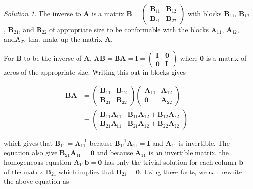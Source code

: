 \documentclass[
]{book}
\theoremstyle{definition}
\theoremstyle{definition}
\theoremstyle{definition}
\theoremstyle{remark}
\newtheorem*{solution}{Solution}
\begin{document}
\begin{solution}

The inverse to \(\mathbf{A}\) is a matrix \(\mathbf{B} = \begin{pmatrix} \mathbf{B}_{11} & \mathbf{B}_{12} \\ \mathbf{B}_{21} & \mathbf{B}_{22} \end{pmatrix}\) with blocks \(\mathbf{B}_{11}\), \(\mathbf{B}_{12}\), \(\mathbf{B}_{21}\), and \(\mathbf{B}_{22}\) of appropriate size to be conformable with the blocks \(\mathbf{A}_{11}\), \(\mathbf{A}_{12}\), and\(\mathbf{A}_{22}\) that make up the matrix \(\mathbf{A}\).

For \(\mathbf{B}\) to be the inverse of \(\mathbf{A}\), \(\mathbf{A}\mathbf{B} = \mathbf{B}\mathbf{A} = \mathbf{I} = \begin{pmatrix} \mathbf{I} & \mathbf{0} \\ \mathbf{0} & \mathbf{I} \end{pmatrix}\) where \(\mathbf{0}\) is a matrix of zeros of the appropriate size. Writing this out in blocks gives

\[
\begin{aligned}
\mathbf{B}\mathbf{A} & = \begin{pmatrix} \mathbf{B}_{11} & \mathbf{B}_{12} \\ \mathbf{B}_{21} & \mathbf{B}_{22} \end{pmatrix}  \begin{pmatrix} \mathbf{A}_{11} & \mathbf{A}_{12} \\ \mathbf{0} & \mathbf{A}_{22} \end{pmatrix} \\
& = \begin{pmatrix} \mathbf{B}_{11} \mathbf{A}_{11} & \mathbf{B}_{11} \mathbf{A}_{12} + \mathbf{B}_{12} \mathbf{A}_{22} \\ \mathbf{B}_{21} \mathbf{A}_{11} & \mathbf{B}_{21} \mathbf{A}_{12} + \mathbf{B}_{22} \mathbf{A}_{22}\end{pmatrix}
\end{aligned}
\]

which gives that \(\mathbf{B}_{11} = \mathbf{A}_{11}^{-1}\) because \(\mathbf{B}_{11}^{-1}\mathbf{A}_{11} = \mathbf{I}\) and \(\mathbf{A}_{11}\) is invertible. The equation also give \(\mathbf{B}_{21} \mathbf{A}_{11} = \mathbf{0}\) and because \(\mathbf{A}_{11}\) is an invertible matrix, the homogeneous equation \(\mathbf{A}_{11}\mathbf{b} = \mathbf{0}\) has only the trivial solution for each column \(\mathbf{b}\) of the matrix \(\mathbf{B}_{21}\) which implies that \(\mathbf{B}_{21} = \mathbf{0}\). Using these facts, we can rewrite the above equation as


\end{solution}
\end{document}
